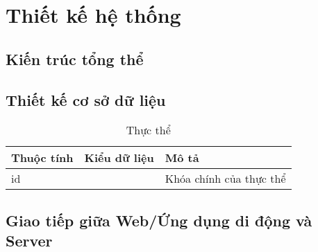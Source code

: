 \chapter{Thiết kế hệ thống} \label{chapter:system_design}
\section{Kiến trúc tổng thể}


\section{Thiết kế cơ sở dữ liệu}
\begin{table}[H]
    \centering
    \begin{tabular}{|p{}|p{}|p{}|}
    \hline 
    \rowcolor[gray]{0.95} 
    \textbf{Thuộc tính}  & \textbf{Kiểu dữ liệu}    & \textbf{Mô tả} \\ \hline 
     id &  & Khóa chính của thực thể\\ \hline
    \end{tabular}
    \caption{Thực thể }
\end{table}
\section{Giao tiếp giữa Web/Ứng dụng di động và Server}




